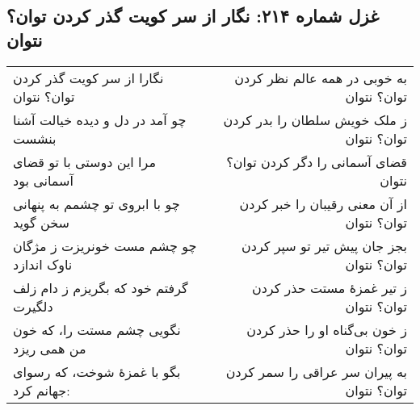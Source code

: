 \begin{center}
\section*{غزل شماره ۲۱۴: نگار از سر کویت گذر کردن توان؟ نتوان}
\label{sec:214}
\begin{longtable}{l p{0.5cm} r}
نگارا از سر کویت گذر کردن توان؟ نتوان
&&
به خوبی در همه عالم نظر کردن توان؟ نتوان
\\
چو آمد در دل و دیده خیالت آشنا بنشست
&&
ز ملک خویش سلطان را بدر کردن توان؟ نتوان
\\
مرا این دوستی با تو قضای آسمانی بود
&&
قضای آسمانی را دگر کردن توان؟ نتوان
\\
چو با ابروی تو چشمم به پنهانی سخن گوید
&&
از آن معنی رقیبان را خبر کردن توان؟ نتوان
\\
چو چشم مست خونریزت ز مژگان ناوک اندازد
&&
بجز جان پیش تیر تو سپر کردن توان؟ نتوان
\\
گرفتم خود که بگریزم ز دام زلف دلگیرت
&&
ز تیر غمزهٔ مستت حذر کردن توان؟ نتوان
\\
نگویی چشم مستت را، که خون من همی ریزد
&&
ز خون بی‌گناه او را حذر کردن توان؟ نتوان
\\
بگو با غمزهٔ شوخت، که رسوای جهانم کرد:
&&
به پیران سر عراقی را سمر کردن توان؟ نتوان
\\
\end{longtable}
\end{center}
